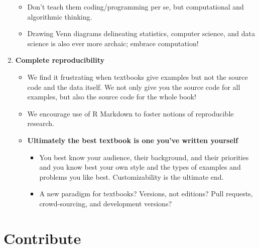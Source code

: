 \documentclass[]{tufte-book}
\providecommand{\tightlist}{%
  \setlength{\itemsep}{0pt}\setlength{\parskip}{0pt}}
\theoremstyle{definition}
\theoremstyle{definition}
\theoremstyle{remark}
\begin{document}
\begin{enumerate}
  \begin{itemize}
  \tightlist
  \item
    Don't teach them coding/programming per se, but computational and
    algorithmic thinking.
  \item
    Drawing Venn diagrams delineating statistics, computer science, and
    data science is also ever more archaic; embrace computation!
  \end{itemize}
\item
  \textbf{Complete reproducibility}

  \begin{itemize}
  \tightlist
  \item
    We find it frustrating when textbooks give examples but not the
    source code and the data itself. We not only give you the source
    code for all examples, but also the source code for the whole book!
  \item
    We encourage use of R Markdown to foster notions of reproducible
    research.
  \item
    \textbf{Ultimately the best textbook is one you've written yourself}

    \begin{itemize}
    \tightlist
    \item
      You best know your audience, their background, and their
      priorities and you know best your own style and the types of
      examples and problems you like best. Customizability is the
      ultimate end.
    \item
      A new paradigm for textbooks? Versions, not editions? Pull
      requests, crowd-sourcing, and development versions?
    \end{itemize}
  \end{itemize}
\end{enumerate}

\section{Contribute}\label{contribute}
\end{document}
